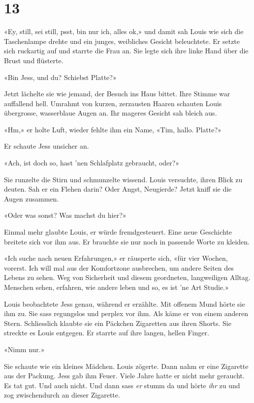 \chapter{13}



«Ey, still, sei still, psst, bin nur ich, alles ok,» und damit sah Louis wie sich die Taschenlampe drehte und ein junges, weibliches Gesicht beleuchtete.
Er setzte sich ruckartig auf und starrte die Frau an. Sie legte sich ihre linke Hand über die Brust und flüsterte.

«Bin Jess, und du? Schiebst Platte?»

Jetzt lächelte sie wie jemand, der Besuch ins Haus bittet. Ihre Stimme war
auffallend hell. Umrahmt von kurzen, zerzausten Haaren schauten Louis
übergrosse, wasserblaue Augen an. Ihr mageres Gesicht sah bleich aus.

«Hm,» er holte Luft, wieder fehlte ihm ein Name, «Tim, hallo.
Platte?»

Er schaute Jess unsicher an.

«Ach, ist doch so, hast ’nen Schlafplatz gebraucht, oder?»

Sie runzelte die Stirn und schmunzelte wissend. Louis versuchte, ihren
Blick zu deuten. Sah er ein Flehen darin? Oder Angst, Neugierde? 
Jetzt kniff sie die Augen zusammen.

«Oder was sonst? Was machst du hier?»

Einmal mehr glaubte Louis, er würde fremdgesteuert. Eine neue Geschichte
breitete sich vor ihm aus. Er brauchte sie nur noch in passende Worte zu
kleiden.

«Ich suche nach neuen Erfahrungen,» er räusperte sich, «für vier Wochen,
vorerst. Ich will mal aus der Komfortzone ausbrechen, um andere Seiten
des Lebens zu sehen. Weg von Sicherheit und diesem geordneten,
langweiligen Alltag. Menschen sehen, erfahren, wie andere leben und so,
es ist ’ne Art Studie.»

Louis beobachtete Jess genau, während er erzählte. Mit offenem Mund
hörte sie ihm zu. Sie sass regungslos und perplex vor ihm. Als käme er
von einem anderen Stern. Schliesslich klaubte sie ein Päckchen
Zigaretten aus ihren Shorts. Sie streckte es Louis entgegen. Er starrte auf ihre
langen, hellen Finger.

«Nimm nur.»

Sie schaute wie ein kleines Mädchen.
Louis zögerte. Dann nahm er eine Zigarette aus der Packung. Jess gab ihm
Feuer.
Viele Jahre hatte er nicht mehr geraucht. Es tat gut. Und auch nicht.
Und dann sass \emph{er} stumm da und hörte \emph{ihr} zu und zog
zwischendurch an dieser Zigarette.

